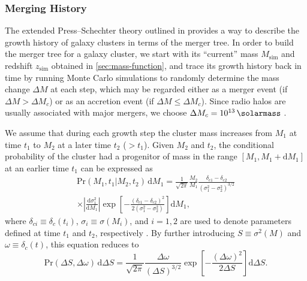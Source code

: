 \documentclass[twocolumn]{aastex62}
\newcommand{\R}[1]{\mathrm{#1}}
\newcommand{\D}[1]{\R{d} #1}
\newcommand{\diff}[2]{\frac{\D{#1}}{\D{#2}}}
\begin{document}
\subsubsection{Merging History}
\label{sec:merging-history}

The extended Press--Schechter theory outlined in \citet{lacey1993} provides
a way to describe the growth history of galaxy clusters in terms of the
merger tree.
In order to build the merger tree for a galaxy cluster, we start with
its \enquote{current} mass $M_{\R{sim}}$ and redshift $z_{\R{sim}}$ obtained
in \autoref{sec:mass-function}, and trace its growth history back in time
by running Monte Carlo simulations to randomly determine the mass change
$\Delta M$ at each step, which may be regarded either as a merger event
(if $\Delta M > \Delta M_c$) or as an accretion event
(if $\Delta M \leq \Delta M_c$).
Since radio halos are usually associated with major mergers, we choose
$\Delta M_c = \SI{e13}{\solarmass}$ \citep[e.g.,][]{cassano2005}.

We assume that during each growth step the cluster mass increases
from $M_1$ at time $t_1$ to $M_2$ at a later time $t_2$ ($> t_1$).
Given $M_2$ and $t_2$, the conditional probability of the cluster had
a progenitor of mass in the range $[M_1, M_1 + \D{M_1}]$ at an earlier
time $t_1$ can be expressed as
\begin{multline}
  \label{eq:eps-condprob}
  \R{Pr}(M_1, t_1 | M_2, t_2) \,\D{M_1} =
    \frac{1}{\sqrt{2\pi}} \frac{M_2}{M_1}
    \frac{\delta_{c1} - \delta_{c2}}{(\sigma_1^2 - \sigma_2^2)^{3/2}} \\
    \times \left| \diff{\sigma_1^2}{M_1} \right|
    \exp \!\left[ -\frac{(\delta_{c1} - \delta_{c2})^2}
      {2(\sigma_1^2 - \sigma_2^2)} \right] \D{M_1},
\end{multline}
where
$\delta_{ci} \equiv \delta_c(t_i)$, $\sigma_i \equiv \sigma(M_i)$, and
$i = 1, 2$ are used to denote parameters defined at time $t_1$ and $t_2$,
respectively \citep{lacey1993,randall2002}.
By further introducing $S \equiv \sigma^2(M)$ and
$\omega \equiv \delta_c(t)$, this equation reduces to
\begin{equation}
  \label{eq:eps-condprob-simp}
  \R{Pr}(\Delta S, \Delta \omega) \,\D{\Delta S} = \frac{1}{\sqrt{2\pi}}
  \frac{\Delta\omega}{(\Delta S)^{3/2}}
  \exp \!\left[ -\frac{(\Delta\omega)^2}{2 \Delta S} \right] \D{\Delta S}.
\end{equation}
\end{document}

